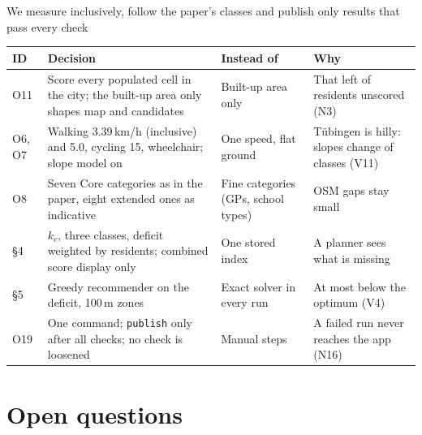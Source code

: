 \documentclass[aspectratio=169,10pt]{beamer}
\begin{document}
\begin{frame}{We measure inclusively, follow the paper's classes and publish only results that
  pass every check}
  \footnotesize
  \begin{tabular}{@{}P{11mm}P{50mm}P{27mm}P{42mm}@{}}
    \toprule
    ID & Decision & Instead of & Why \\
    \midrule
    O11 & Score every populated cell in the city; the built-up area only shapes map and
      candidates & Built-up area only & That left \factUrbanUnscored{} of residents unscored
      (N3) \\
    O6, O7 & Walking 3.39\,km/h (inclusive) and 5.0, cycling 15, wheelchair; slope model on &
      One speed, flat ground & Tübingen is hilly: slopes change \factVElevenChange{} of
      classes (V11) \\
    O8 & Seven Core categories as in the paper, eight extended ones as indicative & Fine
      categories (GPs, school types) & OSM gaps stay small \\
    §4 & $k_c$, three classes, deficit weighted by residents; combined score display only &
      One stored index & A planner sees what is missing \\
    §5 & Greedy recommender on the deficit, 100\,m zones & Exact solver in every run & At most
      \factVFourGap{} below the optimum (V4) \\
    O19 & One command; \texttt{publish} only after all checks; no check is loosened & Manual
      steps & A failed run never reaches the app (N16) \\
    \bottomrule
  \end{tabular}
\end{frame}

\section{Open questions}
\end{document}
